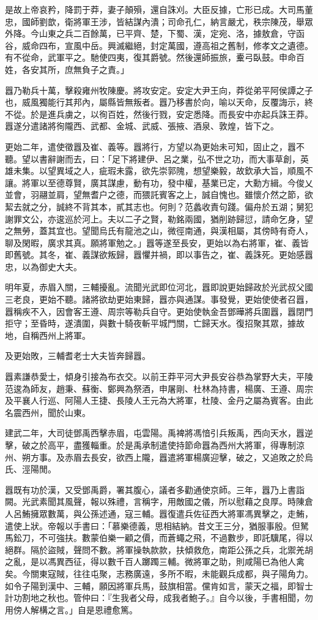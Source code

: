 \begin{pinyinscope}
是故上帝哀矜，降罰于莽，妻子顛殞，還自誅刈。大臣反據，亡形已成。大司馬董忠，國師劉歆，衛將軍王涉，皆結謀內潰；司命孔仁，納言嚴尤，秩宗陳茂，舉眾外降。今山東之兵二百餘萬，已平齊、楚，下蜀、漢，定宛、洛，據敖倉，守函谷，威命四布，宣風中岳。興滅繼絕，封定萬國，遵高祖之舊制，修孝文之遺德。有不從命，武軍平之。馳使四夷，復其爵號。然後還師振旅，櫜弓臥鼓。申命百姓，各安其所，庶無負子之責。」

囂乃勒兵十萬，擊殺雍州牧陳慶。將攻安定。安定大尹王向，莽從弟平阿侯譚之子也，威風獨能行其邦內，屬縣皆無叛者。囂乃移書於向，喻以天命，反覆誨示，終不從。於是進兵虜之，以徇百姓，然後行戮，安定悉降。而長安中亦起兵誅王莽。囂遂分遣諸將徇隴西、武都、金城、武威、張掖、酒泉、敦煌，皆下之。

更始二年，遣使徵囂及崔、義等。囂將行，方望以為更始未可知，固止之，囂不聽。望以書辭謝而去，曰：「足下將建伊、呂之業，弘不世之功，而大事草創，英雄未集。以望異域之人，疵瑕未露，欲先崇郭隗，想望樂毅，故欽承大旨，順風不讓。將軍以至德尊賢，廣其謀慮，動有功，發中權，基業已定，大勳方緝。今俊乂並會，羽翮並肩，望無耆户之德，而猥託賓客之上，誠自愧也。雖懷介然之節，欲絜去就之分，誠終不背其本，貳其志也。何則？范蠡收責句踐。偏舟於五湖；舅犯謝罪文公，亦逡巡於河上。夫以二子之賢，勒銘兩國，猶削跡歸愆，請命乞身，望之無勞，蓋其宜也。望聞烏氏有龍池之山，微徑南通，與漢相屬，其傍時有奇人，聊及閑暇，廣求其真。願將軍勉之。」囂等遂至長安，更始以為右將軍，崔、義皆即舊號。其冬，崔、義謀欲叛歸，囂懼并禍，即以事告之，崔、義誅死。更始感囂忠，以為御史大夫。

明年夏，赤眉入關，三輔擾亂。流聞光武即位河北，囂即說更始歸政於光武叔父國三老良，更始不聽。諸將欲劫更始東歸，囂亦與通謀。事發覺，更始使使者召囂，囂稱疾不入，因會客王遵、周宗等勒兵自守。更始使執金吾鄧曄將兵圍囂，囂閉門拒守；至昏時，遂潰圍，與數十騎夜斬平城門關，亡歸天水。復招聚其眾，據故地，自稱西州上將軍。

及更始敗，三輔耆老士大夫皆奔歸囂。

囂素謙恭愛士，傾身引接為布衣交。以前王莽平河大尹長安谷恭為掌野大夫，平陵范逡為師友，趙秉、蘇衡、鄭興為祭酒，申屠剛、杜林為持書，楊廣、王遵、周宗及平襄人行巡、阿陽人王捷、長陵人王元為大將軍，杜陵、金丹之屬為賓客。由此名震西州，聞於山東。

建武二年，大司徒鄧禹西擊赤眉，屯雲陽。禹裨將馮愔引兵叛禹，西向天水，囂逆擊，破之於高平，盡獲輜重。於是禹承制遣使持節命囂為西州大將軍，得專制涼州、朔方事。及赤眉去長安，欲西上隴，囂遣將軍楊廣迎擊，破之，又追敗之於烏氏、涇陽閒。

囂既有功於漢，又受鄧禹爵，署其腹心，議者多勸通使京師。三年，囂乃上書詣闕。光武素聞其風聲，報以殊禮，言稱字，用敵國之儀，所以慰藉之良厚。時陳倉人呂鮪擁眾數萬，與公孫述通，寇三輔。囂復遣兵佐征西大將軍馮異擊之，走鮪，遣使上狀。帝報以手書曰：「慕樂德義，思相結納。昔文王三分，猶服事殷。但駑馬鈆刀，不可強扶。數蒙伯樂一顧之價，而蒼蠅之飛，不過數步，即託驥尾，得以絕群。隔於盜賊，聲問不數。將軍操執款款，扶傾救危，南距公孫之兵，北禦羌胡之亂，是以馮異西征，得以數千百人躑躅三輔。微將軍之助，則咸陽已為他人禽矣。今關東寇賊，往往屯聚，志務廣遠，多所不暇，未能觀兵成都，與子陽角力。如令子陽到漢中、三輔，願因將軍兵馬，鼓旗相當。儻肯如言，蒙天之福，即智士計功割地之秋也。管仲曰：『生我者父母，成我者鮑子。』自今以後，手書相聞，勿用傍人解構之言。」自是恩禮愈篤。


\end{pinyinscope}
